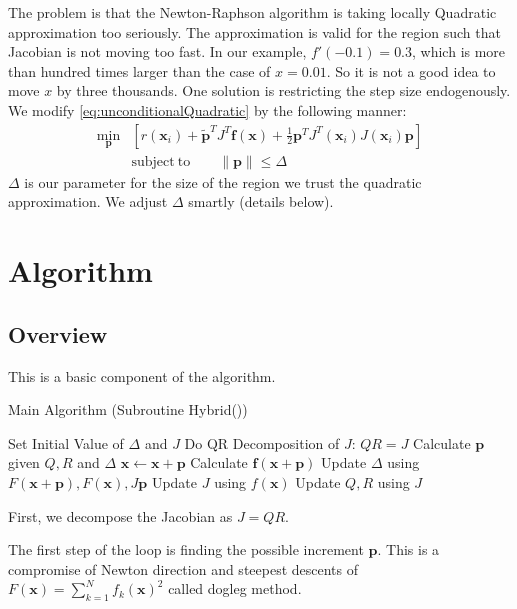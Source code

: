 \documentclass[12pt]{article}
\def\min#1{{\underset{#1}{\mathrm{min}}}}
\def\xb{{\mathbf{x}}}
\def\fb{{\mathbf{f}}}
\def\pb{{\mathbf{p}}}
\begin{document}
The problem is that the Newton-Raphson algorithm is taking locally Quadratic approximation too
seriously. The approximation is valid for the region such that Jacobian is not moving too fast. In
our example, $f'(-0.1) = 0.3$, which is more than hundred times larger than the case of $x=0.01$. So it
is not a good idea to move $x$ by three thousands. One solution is restricting the step size endogenously.  We modify \eqref{eq:unconditionalQuadratic} by the following manner:
\begin{align}
\min{\pb} &\left[ r(\xb_i) + \tilde{\pb}^T J^{T}\fb(\xb)  + 
    \frac{1}{2} \pb^T J^T(\xb_i) J(\xb_i)\pb\right] 
\label{eq:conditionalQuadratic} \\
&\mathrm{subject \ to}\qquad \|\pb\| \le \Delta
\end{align}
$\Delta$ is our parameter for the size of the region we trust the quadratic approximation. We
adjust $\Delta$ smartly (details below). 



\section{Algorithm}
\subsection{Overview}
This is a basic component of the algorithm. 
\begin{algorithm}[ht]
\caption{Main Algorithm (Subroutine Hybrid())}
\label{al:main}
\begin{algorithmic}[1]
\STATE Set Initial Value of $\Delta$ and $J$
\STATE Do QR Decomposition of $J$: $QR = J$
\WHILE{$\text{abs}(F(\xb))>tol$}
    \STATE Calculate $\pb$ given $Q,R$ and $\Delta$ 
    \IF{$F(\xb+\pb)<F(\xb)$} \label{ln:improvedF}
        \STATE $\xb\leftarrow \xb+\pb$
        \STATE Calculate $\fb(\xb+\pb)$
    \ENDIF
    \STATE Update $\Delta$ using $F(\xb+\pb),F(\xb),J\pb$
    \STATE Update $J$ using $f(\xb)$
    \STATE Update $Q,R$ using $J$
\ENDWHILE
\end{algorithmic}
\end{algorithm}
First, we decompose the Jacobian as $J = QR$. 

The first step of the loop is finding the possible increment $\pb$. This is a compromise of Newton
direction and steepest descents of $F(\xb)=\sum_{k=1}^Nf_k(\xb)^2$ called dogleg method.
\end{document}
